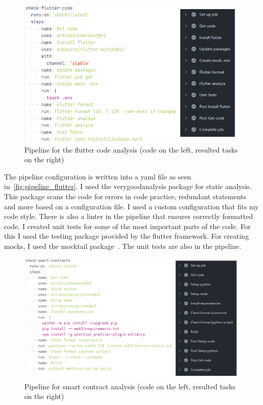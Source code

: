 \documentclass[a4paper,12pt]{report}
\begin{document}
\begin{figure}[H]
    \centering
    \includegraphics[scale=0.6]{images/pipeline/pipeline_flutter.png}
    \caption{Pipeline for the flutter code analysis (code on the left, resulted tasks on the right)}\label{fig:pipeline_flutter}
\end{figure}

The pipeline configuration is written into a yaml file as seen
in~\autoref{fig:pipeline_flutter}. I used the verygoodanalysis package for
static analysis. This package scans the code for errors in code practice,
redundant statements and more based on a configuration file. I used a custom
configuration that fits my code style. There is also a linter in the pipeline
that ensures correctly formatted code. I created unit tests for some of the
most important parts of the code. For this I used the testing package provided
by the flutter framework. For creating mocks, I used the mocktail
package~\cite{mocktailDocs}. The unit tests are also in the pipeline.

\begin{figure}[H]
    \centering
    \includegraphics[scale=0.6]{images/pipeline/pipeline_blockchain.png}
    \caption{Pipeline for smart contract analysis (code on the left, resulted tasks on the right)}\label{fig:pipeline_blockchain}
\end{figure}
\end{document}
